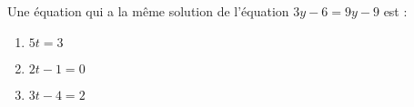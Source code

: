 Une équation qui a la même solution de l'équation $3y-6=9y-9$ est :
\begin{multicols}{3}
    \begin{enumerate}[label=\alph*)]
        \item $5t=3$
        \item $2t-1=0$
        \item $3t-4=2$
    \end{enumerate}
\end{multicols}